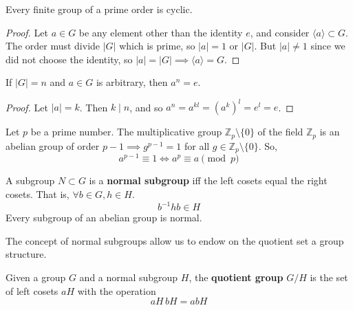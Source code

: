   \begin{corollary}
    Every finite group of a prime order is cyclic. 
  \end{corollary}
  \begin{proof}
    Let $a \in G$ be any element other than the identity $e$, and consider $\langle a \rangle \subset G$. The order must divide $|G|$ which is prime, so $|a| = 1$ or $|G|$. But $|a| \neq 1$ since we did not choose the identity, so $|a| = |G| \implies \langle a \rangle = G$. 
  \end{proof}

  \begin{corollary}
    If $|G| = n$ and $a \in G$ is arbitrary, then $a^n = e$. 
  \end{corollary}
  \begin{proof}
    Let $|a| = k$. Then $k \mid n$, and so $a^n = a^{kl} = (a^k)^l = e^l = e$. 
  \end{proof}

  \begin{corollary}
    Let $p$ be a prime number. The multiplicative group $\mathbb{Z}_{p} \setminus \{0\}$ of the field $\mathbb{Z}_{p}$ is an abelian group of order $p-1 \implies g^{p-1} = 1$ for all $g \in \mathbb{Z}_{p} \setminus \{0\}$. So,
    \begin{equation}
      a^{p-1} \equiv 1 \iff a^{p} \equiv a \pmod{p}
    \end{equation}
  \end{corollary} 

  \begin{definition}
    A subgroup $N \subset G$ is a \textbf{normal subgroup} iff the left cosets equal the right cosets. That is, $\forall b \in G, h \in H$. 
    \begin{equation}
      b^{-1} h b \in H
    \end{equation}
    Every subgroup of an abelian group is normal. 
  \end{definition} 

  The concept of normal subgroups allow us to endow on the quotient set a group structure. 

  \begin{definition}
    Given a group $G$ and a normal subgroup $H$, the \textbf{quotient group} $G/H$ is the set of left cosets $aH$ with the operation 
    \begin{equation}
      aH \, bH = abH
    \end{equation}
  \end{definition}

